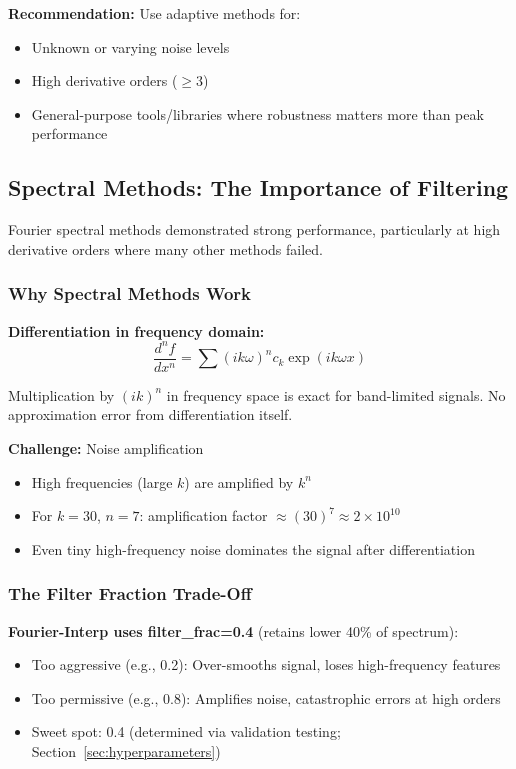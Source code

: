 \textbf{Recommendation:} Use adaptive methods for:
\begin{itemize}
    \item Unknown or varying noise levels
    \item High derivative orders ($\geq 3$)
    \item General-purpose tools/libraries where robustness matters more than peak performance
\end{itemize}

\subsection{Spectral Methods: The Importance of Filtering}
\label{sec:spectral_filtering}

Fourier spectral methods demonstrated strong performance, particularly at high derivative orders where many other methods failed.

\subsubsection{Why Spectral Methods Work}

\textbf{Differentiation in frequency domain:}
\begin{equation}
\frac{d^n f}{dx^n} = \sum (i k \omega)^n c_k \exp(i k \omega x)
\end{equation}

Multiplication by $(ik)^n$ in frequency space is exact for band-limited signals. No approximation error from differentiation itself.

\textbf{Challenge:} Noise amplification
\begin{itemize}
    \item High frequencies (large $k$) are amplified by $k^n$
    \item For $k=30$, $n=7$: amplification factor $\approx (30)^7 \approx 2 \times 10^{10}$
    \item Even tiny high-frequency noise dominates the signal after differentiation
\end{itemize}

\subsubsection{The Filter Fraction Trade-Off}

\textbf{Fourier-Interp uses filter\_frac=0.4} (retains lower 40\% of spectrum):
\begin{itemize}
    \item Too aggressive (e.g., 0.2): Over-smooths signal, loses high-frequency features
    \item Too permissive (e.g., 0.8): Amplifies noise, catastrophic errors at high orders
    \item Sweet spot: 0.4 (determined via validation testing; Section~\ref{sec:hyperparameters})
\end{itemize}

